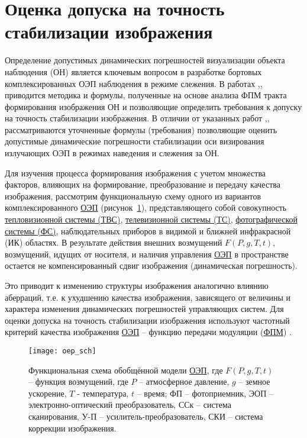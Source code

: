 \section{Оценка допуска на точность стабилизации изображения} \label{sec:ch2/sec2}
Определение допустимых динамических погрешностей визуализации объекта наблюдения (ОН) является ключевым вопросом в разработке бортовых комплексированных ОЭП наблюдения в режиме слежения. В работах \cite[]{Molin21},\cite[]{Sokolski22},\cite[]{Belyakov} приводится методика и формулы, полученные на основе анализа ФПМ тракта формирования изображения ОН и позволяющие определить требования к допуску на точность стабилизации изображения. В отличии от указанных работ \cite[]{Molin21},\cite[]{Sokolski22},\cite[]{Belyakov} рассматриваются  уточненные формулы  (требования) позволяющие оценить допустимые динамические погрешности  стабилизации оси визирования излучающих ОЭП в режимах наведения и слежения за ОН.

Для изучения процесса формирования изображения с учетом множества факторов, влияющих на формирование, преобразование и передачу качества изображения, рассмотрим функциональную схему одного из вариантов комплексированного \hyperref[acroEOS]{ОЭП} (рисунок~\ref{fig:oep_sch}), представляющего собой совокупность \hyperref[acroTVS]{тепловизионной системы (ТВС)}, \hyperref[acroTS]{телевизионной системы (ТС)}, \hyperref[acroFS]{фотографической системы (ФС)}, наблюдательных приборов в видимой и ближней инфракрасной (ИК) областях. В результате действия внешних возмущений $F(P,g,T,t)$, возмущений, идущих от носителя, и наличия управления \hyperref[acroEOS]{ОЭП} в пространстве остается не компенсированный сдвиг изображения (динамическая погрешность).



\newpage
Это приводит к изменению структуры изображения аналогично влиянию аберраций, т.е. к ухудшению качества изображения, зависящего от величины и характера изменения динамических погрешностей управляющих систем. Для оценки допуска на точность стабилизации изображения используют частотный критерий качества изображения \hyperref[acroEOS]{ОЭП} – функцию передачи модуляции (\hyperref[acroFPM]{ФПМ}) \cite[]{Tarasov}.

\begin{figure}[ht]
	\centering
	\texttt{[image: oep\_sch]} 
	\caption{Функциональная схема обобщённой модели \hyperref[acroEOS]{ОЭП}, где $F(P,g,T,t)$ – функция возмущений, где $P$ – атмосферное давление, $g$ – земное ускорение, $T$ - температура, $t$ – время; ФП – фотоприемник, ЭОП – электронно-оптический преобразователь, ССк – система сканирования, У-П – усилитель-преобразователь, СКИ – система коррекции изображения.}
	\label{fig:oep_sch}
\end{figure}

